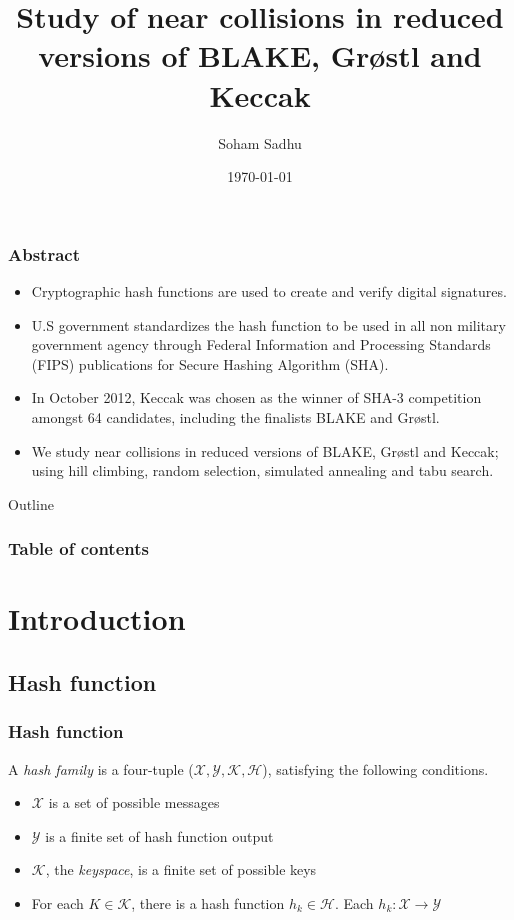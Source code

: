 \documentclass{beamer}
\begin{document}
\title{Study of near collisions in reduced versions of BLAKE, Gr{\o}stl and Keccak}  
\author{Soham Sadhu}
\date{\today} 

\begin{frame}
\titlepage
\end{frame}

\begin{frame}
\frametitle{Abstract}
\begin{itemize}
\item Cryptographic hash functions are used to create and verify digital signatures.
\item U.S government standardizes the hash function to be used in all non military government 
agency through Federal Information and Processing Standards (FIPS) publications for
Secure Hashing Algorithm (SHA).
\item In October 2012, Keccak was chosen as the winner of SHA-3 competition amongst 64 candidates, including 
the finalists BLAKE and Gr{\o}stl.
\item We study near collisions in reduced versions of BLAKE, Gr{\o}stl and Keccak; using hill
climbing, random selection, simulated annealing and tabu search.
\end{itemize}
\end{frame}

\begin{frame}[allowframebreaks]{Outline}
\frametitle{Table of contents}
\tableofcontents
\end{frame} 

\section{Introduction}

\subsection{Hash function}
\begin{frame}
  \frametitle{Hash function}
  A \emph{hash family} is a four-tuple ($\mathcal{X}, \mathcal{Y}, \mathcal{K}, \mathcal{H}$),
  satisfying the following conditions.\footnotemark
  \begin{itemize}
    \item $\mathcal{X}$ is a set of possible messages
    \item $\mathcal{Y}$ is a finite set of hash function output
    \item $\mathcal{K}$, the \emph{keyspace}, is a finite set of possible keys
    \item For each $K \in \mathcal{K}$, there is a hash function $h_{k} \in \mathcal{H}$. Each 
      $h_{k}: \mathcal{X} \to \mathcal{Y}$ 
  \end{itemize}
\end{frame}
\end{document}
